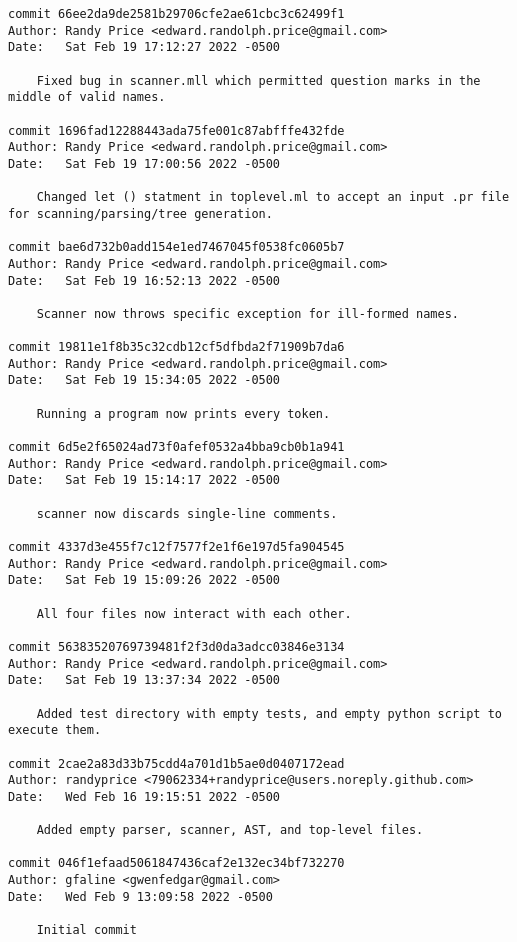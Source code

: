 {\begin{verbatim}
commit 66ee2da9de2581b29706cfe2ae61cbc3c62499f1
Author: Randy Price <edward.randolph.price@gmail.com>
Date:   Sat Feb 19 17:12:27 2022 -0500

    Fixed bug in scanner.mll which permitted question marks in the middle of valid names.

commit 1696fad12288443ada75fe001c87abfffe432fde
Author: Randy Price <edward.randolph.price@gmail.com>
Date:   Sat Feb 19 17:00:56 2022 -0500

    Changed let () statment in toplevel.ml to accept an input .pr file for scanning/parsing/tree generation.

commit bae6d732b0add154e1ed7467045f0538fc0605b7
Author: Randy Price <edward.randolph.price@gmail.com>
Date:   Sat Feb 19 16:52:13 2022 -0500

    Scanner now throws specific exception for ill-formed names.

commit 19811e1f8b35c32cdb12cf5dfbda2f71909b7da6
Author: Randy Price <edward.randolph.price@gmail.com>
Date:   Sat Feb 19 15:34:05 2022 -0500

    Running a program now prints every token.

commit 6d5e2f65024ad73f0afef0532a4bba9cb0b1a941
Author: Randy Price <edward.randolph.price@gmail.com>
Date:   Sat Feb 19 15:14:17 2022 -0500

    scanner now discards single-line comments.

commit 4337d3e455f7c12f7577f2e1f6e197d5fa904545
Author: Randy Price <edward.randolph.price@gmail.com>
Date:   Sat Feb 19 15:09:26 2022 -0500

    All four files now interact with each other.

commit 56383520769739481f2f3d0da3adcc03846e3134
Author: Randy Price <edward.randolph.price@gmail.com>
Date:   Sat Feb 19 13:37:34 2022 -0500

    Added test directory with empty tests, and empty python script to execute them.

commit 2cae2a83d33b75cdd4a701d1b5ae0d0407172ead
Author: randyprice <79062334+randyprice@users.noreply.github.com>
Date:   Wed Feb 16 19:15:51 2022 -0500

    Added empty parser, scanner, AST, and top-level files.

commit 046f1efaad5061847436caf2e132ec34bf732270
Author: gfaline <gwenfedgar@gmail.com>
Date:   Wed Feb 9 13:09:58 2022 -0500

    Initial commit
 
\end{verbatim}
}
